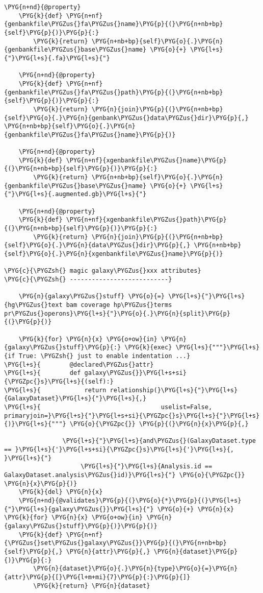 \begin{Verbatim}[commandchars=\\\{\}]
    \PYG{n+nd}{@property}
    \PYG{k}{def} \PYG{n+nf}{genbankfile\PYGZus{}fa\PYGZus{}name}\PYG{p}{(}\PYG{n+nb+bp}{self}\PYG{p}{)}\PYG{p}{:}
        \PYG{k}{return} \PYG{n+nb+bp}{self}\PYG{o}{.}\PYG{n}{genbankfile\PYGZus{}base\PYGZus{}name} \PYG{o}{+} \PYG{l+s}{"}\PYG{l+s}{.fa}\PYG{l+s}{"}

    \PYG{n+nd}{@property}
    \PYG{k}{def} \PYG{n+nf}{genbankfile\PYGZus{}fa\PYGZus{}path}\PYG{p}{(}\PYG{n+nb+bp}{self}\PYG{p}{)}\PYG{p}{:}
        \PYG{k}{return} \PYG{n}{join}\PYG{p}{(}\PYG{n+nb+bp}{self}\PYG{o}{.}\PYG{n}{genbank\PYGZus{}data\PYGZus{}dir}\PYG{p}{,} \PYG{n+nb+bp}{self}\PYG{o}{.}\PYG{n}{genbankfile\PYGZus{}fa\PYGZus{}name}\PYG{p}{)}

    \PYG{n+nd}{@property}
    \PYG{k}{def} \PYG{n+nf}{xgenbankfile\PYGZus{}name}\PYG{p}{(}\PYG{n+nb+bp}{self}\PYG{p}{)}\PYG{p}{:}
        \PYG{k}{return} \PYG{n+nb+bp}{self}\PYG{o}{.}\PYG{n}{genbankfile\PYGZus{}base\PYGZus{}name} \PYG{o}{+} \PYG{l+s}{"}\PYG{l+s}{.augmented.gb}\PYG{l+s}{"}

    \PYG{n+nd}{@property}
    \PYG{k}{def} \PYG{n+nf}{xgenbankfile\PYGZus{}path}\PYG{p}{(}\PYG{n+nb+bp}{self}\PYG{p}{)}\PYG{p}{:}
        \PYG{k}{return} \PYG{n}{join}\PYG{p}{(}\PYG{n+nb+bp}{self}\PYG{o}{.}\PYG{n}{data\PYGZus{}dir}\PYG{p}{,} \PYG{n+nb+bp}{self}\PYG{o}{.}\PYG{n}{xgenbankfile\PYGZus{}name}\PYG{p}{)}

\PYG{c}{\PYGZsh{} magic galaxy\PYGZus{}xxx attributes}
\PYG{c}{\PYGZsh{} ---------------------------}

    \PYG{n}{galaxy\PYGZus{}stuff} \PYG{o}{=} \PYG{l+s}{"}\PYG{l+s}{hg\PYGZus{}text bam coverage hp\PYGZus{}terms pr\PYGZus{}operons}\PYG{l+s}{"}\PYG{o}{.}\PYG{n}{split}\PYG{p}{(}\PYG{p}{)}

    \PYG{k}{for} \PYG{n}{x} \PYG{o+ow}{in} \PYG{n}{galaxy\PYGZus{}stuff}\PYG{p}{:} \PYG{k}{exec} \PYG{l+s}{"""}\PYG{l+s}{if True: \PYGZsh{} just to enable indentation ...}
\PYG{l+s}{        @declared\PYGZus{}attr}
\PYG{l+s}{        def galaxy\PYGZus{}}\PYG{l+s+si}{\PYGZpc{}s}\PYG{l+s}{(self):}
\PYG{l+s}{            return relationship(}\PYG{l+s}{"}\PYG{l+s}{GalaxyDataset}\PYG{l+s}{"}\PYG{l+s}{,}
\PYG{l+s}{                                 uselist=False, primaryjoin=}\PYG{l+s}{"}\PYG{l+s+si}{\PYGZpc{}s}\PYG{l+s}{"}\PYG{l+s}{)}\PYG{l+s}{"""} \PYG{o}{\PYGZpc{}} \PYG{p}{(}\PYG{n}{x}\PYG{p}{,}

                \PYG{l+s}{"}\PYG{l+s}{and\PYGZus{}(GalaxyDataset.type == }\PYG{l+s}{'}\PYG{l+s+si}{\PYGZpc{}s}\PYG{l+s}{'}\PYG{l+s}{, }\PYG{l+s}{"}
                     \PYG{l+s}{"}\PYG{l+s}{Analysis.id == GalaxyDataset.analysis\PYGZus{}id)}\PYG{l+s}{"} \PYG{o}{\PYGZpc{}} \PYG{n}{x}\PYG{p}{)}
    \PYG{k}{del} \PYG{n}{x}
    \PYG{n+nd}{@validates}\PYG{p}{(}\PYG{o}{*}\PYG{p}{(}\PYG{l+s}{"}\PYG{l+s}{galaxy\PYGZus{}}\PYG{l+s}{"} \PYG{o}{+} \PYG{n}{x} \PYG{k}{for} \PYG{n}{x} \PYG{o+ow}{in} \PYG{n}{galaxy\PYGZus{}stuff}\PYG{p}{)}\PYG{p}{)}
    \PYG{k}{def} \PYG{n+nf}{\PYGZus{}set\PYGZus{}galaxy\PYGZus{}}\PYG{p}{(}\PYG{n+nb+bp}{self}\PYG{p}{,} \PYG{n}{attr}\PYG{p}{,} \PYG{n}{dataset}\PYG{p}{)}\PYG{p}{:}
        \PYG{n}{dataset}\PYG{o}{.}\PYG{n}{type}\PYG{o}{=}\PYG{n}{attr}\PYG{p}{[}\PYG{l+m+mi}{7}\PYG{p}{:}\PYG{p}{]}
        \PYG{k}{return} \PYG{n}{dataset}


\end{Verbatim}
